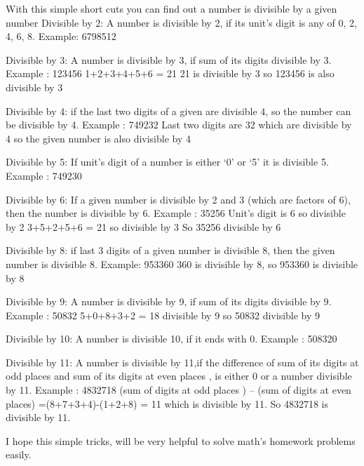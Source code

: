 \documentclass[12pt]{article}
\begin{document}
With this simple short cuts you can find out a number is divisible by a given number
Divisible by 2: A number is divisible by 2, if its unit’s digit is any of 0, 2, 4, 6, 8.
Example: 6798512

Divisible by 3: A number is divisible by 3, if sum of its digits divisible by 3.
Example : 123456
 1+2+3+4+5+6 = 21
21 is divisible by 3 so 123456 is also divisible by 3 

Divisible by 4: if the last two digits of a given are divisible 4, so the number can be divisible by 4.
Example : 749232
Last two digits are 32 which are divisible by 4 so the given number is also divisible by 4

Divisible by 5: If unit’s digit of a number is either ‘0’ or ‘5’ it is divisible 5.
Example : 749230

Divisible by 6: If a given number is divisible by 2 and 3 (which are factors of 6), then the number is divisible by 6.
Example : 35256
Unit’s digit is 6 so divisible by 2
3+5+2+5+6 = 21 so divisible by 3
So 35256 divisible by 6

Divisible by 8: if last 3 digits of a given number is divisible 8, then the given number is divisible 8.
Example: 953360
360 is divisible by 8, so 953360 is divisible by 8

Divisible by 9: A number is divisible by 9, if sum of its digits divisible by 9. 
Example : 50832
5+0+8+3+2 = 18 divisible by 9 so 50832 divisible by 9 

Divisible by 10: A number is divisible 10, if it ends with 0.
Example : 508320

Divisible by 11: A number is divisible by 11,if the difference of sum of its digits at odd places and sum of its digits at even places , is either 0 or a number divisible by 11.
Example : 4832718
(sum of digits at odd places ) – (sum of digits at even places)
=(8+7+3+4)-(1+2+8) = 11 which is divisible by 11.
So 4832718 is divisible by 11.

I hope this simple tricks, will be very helpful to solve math’s homework problems easily.
\end{document}
